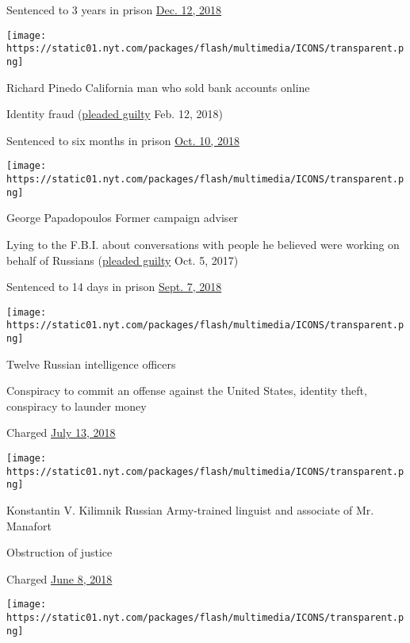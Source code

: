 Sentenced to 3 years in prison
\href{https://www.nytimes.com/2018/12/12/nyregion/michael-cohen-sentence-trump.html}{Dec.
12, 2018}

\texttt{[image: https://static01.nyt.com/packages/flash/multimedia/ICONS/transparent.png]}

Richard Pinedo California man who sold bank accounts online

Identity fraud
(\href{https://www.nytimes.com/2018/02/16/us/politics/richard-pinedo-russia-bank-accounts-guilty-plea-mueller.html}{pleaded
guilty} Feb. 12, 2018)

Sentenced to six months in prison
\href{https://www.nytimes.com/2018/10/10/us/politics/richard-pinedo-sentencing-mueller.html}{Oct.
10, 2018}

\texttt{[image: https://static01.nyt.com/packages/flash/multimedia/ICONS/transparent.png]}

George Papadopoulos Former campaign adviser

Lying to the F.B.I. about conversations with people he believed were
working on behalf of Russians
(\href{https://www.nytimes.com/2017/10/30/us/politics/george-papadopoulos-russia-trump.html}{pleaded
guilty} Oct. 5, 2017)

Sentenced to 14 days in prison
\href{https://www.nytimes.com/2018/09/07/us/politics/george-papadopoulos-sentencing-special-counsel-investigation.html}{Sept.
7, 2018}

\texttt{[image: https://static01.nyt.com/packages/flash/multimedia/ICONS/transparent.png]}

Twelve Russian intelligence officers

Conspiracy to commit an offense against the United States, identity
theft, conspiracy to launder money

Charged
\href{https://www.nytimes.com/2018/07/13/us/politics/mueller-indictment-russian-intelligence-hacking.html}{July
13, 2018}

\texttt{[image: https://static01.nyt.com/packages/flash/multimedia/ICONS/transparent.png]}

Konstantin V. Kilimnik Russian Army-trained linguist and associate of
Mr. Manafort

Obstruction of justice

Charged
\href{https://www.nytimes.com/2018/06/08/us/politics/manafort-obstruction-kilimnik-charges.html}{June
8, 2018}

\texttt{[image: https://static01.nyt.com/packages/flash/multimedia/ICONS/transparent.png]}

